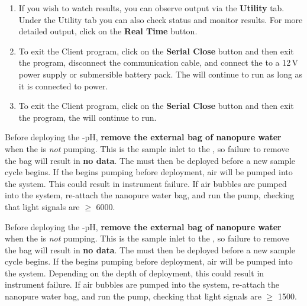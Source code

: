 \begin{enumerate}
    \item If you wish to watch results, you can observe output via the \textbf{Utility} tab. Under the Utility tab you can also check \instType{} status and monitor results. For more detailed output, click on the \textbf{Real Time} button. \ifcase {} \else \fi
    
    \ifcase \inst %
    
        \item To exit \instType{} the Client program, click on the \textbf{Serial Close} button and then exit the program, disconnect the communication cable, and connect the \instType{} to a 12\,V power supply or submersible battery pack.  The \instType{} will continue to run as long as it is connected to power.

    \else		%
    
        \item To exit the \instType{} Client program, click on the \textbf{Serial Close} button and then exit the program, the \instType{} will continue to run.

    \fi
\end{enumerate}

\ifcase \inst	%

    {\color{red}Before deploying the \instType{}-pH, \textbf{remove the external bag of nanopure water} when the \instType{} is \textit{not} pumping.  This is the sample inlet to the \instType{}, so failure to remove the bag will result in \textbf{no data}.  The \instType{} must then be deployed before a new sample cycle begins.  If the \instType{} begins pumping before deployment, air will be pumped into the system.  This could result in instrument failure.  If air bubbles are pumped into the system, re-attach the nanopure water bag, and run the \instType{} pump, checking that light signals are $\geq$ 6000.}

\or			%

    {\color{red}Before deploying the \instType{}-pH, \textbf{remove the external bag of nanopure water} when the \instType{} is \textit{not} pumping.  This is the sample inlet to the \instType{}, so failure to remove the bag will result in \textbf{no data}.  The \instType{} must then be deployed before a new sample cycle begins.  If the \instType{} begins pumping before deployment, air will be pumped into the system.  Depending on the depth of deployment, this could result in instrument failure.  If air bubbles are pumped into the system, re-attach the nanopure water bag, and run the \instType{} pump, checking that light signals are $\geq$ 1500.}

